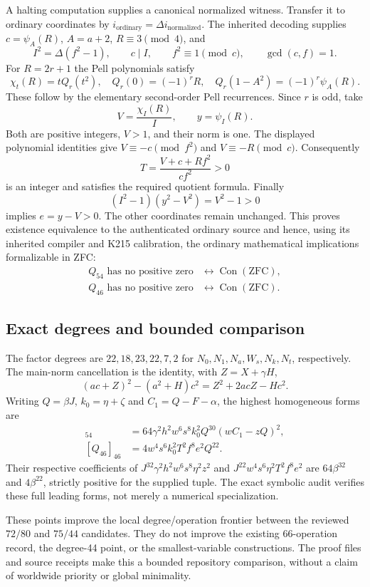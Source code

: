 A halting computation supplies a canonical normalized witness.
Transfer it to ordinary coordinates by
$i_{\mathrm{ordinary}}=\Delta i_{\mathrm{normalized}}$.
The inherited decoding supplies $c=\psi_A(R)$,
$A=a+2$, $R\equiv3\pmod4$, and
\[
 I^2=\Delta(f^2-1),\qquad c\mid I,
 \qquad f^2\equiv1\pmod c,
 \qquad \gcd(c,f)=1.
\]
For $R=2r+1$ the Pell polynomials satisfy
\[
 \chi_t(R)=tQ_r(t^2),\quad
 Q_r(0)=(-1)^rR,\quad
 Q_r(1-A^2)=(-1)^r\psi_A(R).
\]
These follow by the elementary second-order Pell recurrences. Since $r$
is odd, take
\[
 V=\frac{\chi_I(R)}{I},\qquad y=\psi_I(R).
\]
Both are positive integers, $V>1$, and their norm is one. The displayed
polynomial identities give $V\equiv-c\pmod{f^2}$ and
$V\equiv-R\pmod c$. Consequently
\[
 T=\frac{V+c+Rf^2}{cf^2}>0
\]
is an integer and satisfies the required quotient formula. Finally
\[
 (I^2-1)(y^2-V^2)=V^2-1>0
\]
implies $e=y-V>0$. The other coordinates remain unchanged. This proves
existence equivalence to the authenticated ordinary source and hence,
using its inherited compiler and K215 calibration, the ordinary
mathematical implications formalizable in ZFC:
\begin{align*}
 \text{$Q_{54}$ has no positive zero}&\longleftrightarrow
 \operatorname{Con}(\mathrm{ZFC}),\\
 \text{$Q_{46}$ has no positive zero}&\longleftrightarrow
 \operatorname{Con}(\mathrm{ZFC}).
\end{align*}

\subsection{Exact degrees and bounded comparison}

The factor degrees are $22,18,23,22,7,2$ for
$N_0,N_1,N_a,W_s,N_k,N_t$, respectively. The main-norm cancellation is
the identity, with $Z=X+\gamma H$,
\[
 (ac+Z)^2-(a^2+H)c^2=Z^2+2acZ-Hc^2.
\]
Writing $Q=\beta J$, $k_0=\eta+\zeta$ and
$C_1=Q-F-\alpha$, the highest homogeneous forms are
\begin{align*}
 [Q_{54}]_{54}
 &=64\gamma^2h^2w^6s^8k_0^2Q^{30}(wC_1-zQ)^2,\\
 [Q_{46}]_{46}
 &=4w^4s^6k_0^2T^2f^8e^2Q^{22}.
\end{align*}
Their respective coefficients of
$J^{32}\gamma^2h^2w^6s^8\eta^2z^2$ and
$J^{22}w^4s^6\eta^2T^2f^8e^2$ are
$64\beta^{32}$ and $4\beta^{22}$, strictly positive for the supplied
tuple. The exact symbolic audit verifies these full leading forms,
not merely a numerical specialization.

These points improve the local degree/operation frontier between the
reviewed $72/80$ and $75/44$ candidates. They do not improve the existing
66-operation record, the degree-44 point, or the smallest-variable
constructions. The proof files and source receipts make this a bounded
repository comparison, without a claim of worldwide priority or global
minimality.
